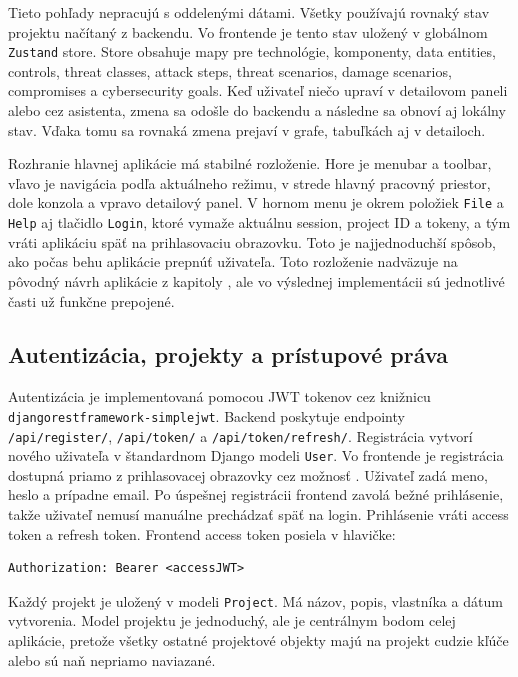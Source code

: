 \documentclass[11pt]{article}
\begin{document}
Tieto pohľady nepracujú s oddelenými dátami. Všetky používajú rovnaký stav projektu načítaný z backendu. Vo frontende je tento stav uložený v globálnom \texttt{Zustand} store. Store obsahuje mapy pre technológie, komponenty, data entities, controls, threat classes, attack steps, threat scenarios, damage scenarios, compromises a cybersecurity goals. Keď uživateľ niečo upraví v detailovom paneli alebo cez asistenta, zmena sa odošle do backendu a následne sa obnoví aj lokálny stav. Vďaka tomu sa rovnaká zmena prejaví v grafe, tabuľkách aj v detailoch.

Rozhranie hlavnej aplikácie má stabilné rozloženie. Hore je menubar a toolbar, vľavo je navigácia podľa aktuálneho režimu, v strede hlavný pracovný priestor, dole konzola a vpravo detailový panel. V hornom menu je okrem položiek \texttt{File} a \texttt{Help} aj tlačidlo \texttt{Login}, ktoré vymaže aktuálnu session, project ID a tokeny, a tým vráti aplikáciu späť na prihlasovaciu obrazovku. Toto je najjednoduchší spôsob, ako počas behu aplikácie prepnúť uživateľa. Toto rozloženie nadväzuje na pôvodný návrh aplikácie z kapitoly , ale vo výslednej implementácii sú jednotlivé časti už funkčne prepojené.

\subsection{Autentizácia, projekty a prístupové práva}

Autentizácia je implementovaná pomocou JWT tokenov cez knižnicu \texttt{djangorestframework-simplejwt}. Backend poskytuje endpointy \texttt{/api/register/}, \texttt{/api/token/} a \texttt{/api/token/refresh/}. Registrácia vytvorí nového uživateľa v štandardnom Django modeli \texttt{User}. Vo frontende je registrácia dostupná priamo z prihlasovacej obrazovky cez možnosť . Uživateľ zadá meno, heslo a prípadne email. Po úspešnej registrácii frontend zavolá bežné prihlásenie, takže uživateľ nemusí manuálne prechádzať späť na login. Prihlásenie vráti access token a refresh token. Frontend access token posiela v hlavičke:

\begin{verbatim}
Authorization: Bearer <accessJWT>
\end{verbatim}

Každý projekt je uložený v modeli \texttt{Project}. Má názov, popis, vlastníka a dátum vytvorenia. Model projektu je jednoduchý, ale je centrálnym bodom celej aplikácie, pretože všetky ostatné projektové objekty majú na projekt cudzie kľúče alebo sú naň nepriamo naviazané.
\end{document}

